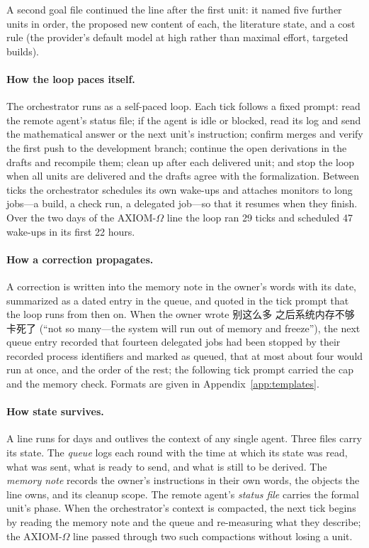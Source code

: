 \documentclass[11pt]{article}
\newcommand{\zh}[1]{#1}
\begin{document}
A second goal file continued the line after the first unit: it named five
further units in order, the proposed new content of each, the literature
state, and a cost rule (the provider's default model at high rather than
maximal effort, targeted builds).

\paragraph{How the loop paces itself.} The orchestrator runs as a
self-paced loop. Each tick follows a fixed prompt: read the remote agent's
status file; if the agent is idle or blocked, read its log and send the
mathematical answer or the next unit's instruction; confirm merges and
verify the first push to the development branch; continue the open
derivations in the drafts and recompile them; clean up after each delivered
unit; and stop the loop when all units are delivered and the drafts agree
with the formalization. Between ticks the orchestrator schedules its own
wake-ups and attaches monitors to long jobs---a build, a check run, a
delegated job---so that it resumes when they finish. Over the two days of the
AXIOM-$\Omega$ line the loop ran 29 ticks and scheduled 47 wake-ups in its
first 22 hours.

\paragraph{How a correction propagates.} A correction is written into the
memory note in the owner's words with its date, summarized as a dated entry
in the queue, and quoted in the tick prompt that the loop runs from then on.
When the owner wrote \zh{别这么多 之后系统内存不够卡死了} (``not so many---the
system will run out of memory and freeze''), the next queue entry recorded
that fourteen delegated jobs had been stopped by their recorded process
identifiers and marked as queued, that at most about four would run at once,
and the order of the rest; the following tick prompt carried the cap and the
memory check. Formats are given in Appendix~\ref{app:templates}.

\paragraph{How state survives.} A line runs for days and outlives the
context of any single agent. Three files carry its state. The \emph{queue}
logs each round with the time at which its state was read, what was sent,
what is ready to send, and what is still to be derived. The \emph{memory
note} records the owner's instructions in their own words, the objects the
line owns, and its cleanup scope. The remote agent's \emph{status file}
carries the formal unit's phase. When the orchestrator's context is
compacted, the next tick begins by reading the memory note and the queue and
re-measuring what they describe; the AXIOM-$\Omega$ line passed through two
such compactions without losing a unit.
\end{document}
